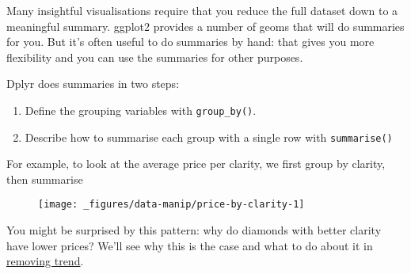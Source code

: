 Many insightful visualisations require that you reduce the full dataset
down to a meaningful summary. ggplot2 provides a number of geoms that
will do summaries for you. But it's often useful to do summaries by
hand: that gives you more flexibility and you can use the summaries for
other purposes.  

Dplyr does summaries in two steps:

\begin{enumerate}
\def\labelenumi{\arabic{enumi}.}
\tightlist
\item
  Define the grouping variables with \texttt{group\_by()}.
\item
  Describe how to summarise each group with a single row with
  \texttt{summarise()}
\end{enumerate}

For example, to look at the average price per clarity, we first group by
clarity, then summarise

\begin{Shaded}
\begin{Highlighting}[]
\StringTok{ }
\StringTok{ } 
\CommentTok{#> }

\StringTok{ }
\StringTok{  }\NormalTok{(}\NormalTok{(} \NormalTok{), } \NormalTok{) +}
\StringTok{  }\NormalTok{(} \NormalTok{)}
\end{Highlighting}
\end{Shaded}

\begin{figure}[H]
  \centering
  \texttt{[image: \_figures/data-manip/price-by-clarity-1]}
\end{figure}

You might be surprised by this pattern: why do diamonds with better
clarity have lower prices? We'll see why this is the case and what to do
about it in \hyperref[sub:trend]{removing trend}.

